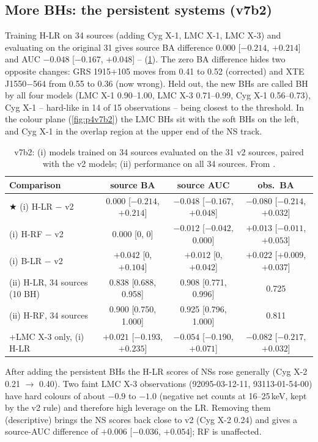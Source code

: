 \subsection{More BHs: the persistent systems (v7b2)}\label{sec:p4v7b2}
\Primary{} Training H-LR on 34 sources (adding Cyg X-1, LMC X-1, LMC X-3) and evaluating on the original 31 gives source BA
difference $0.000$ [$-0.214$, $+0.214$] and AUC $-0.048$ [$-0.167$, $+0.048$] -- \NotDetected{} (\cref{tab:p4v7b2}). The zero
BA difference hides two opposite changes: GRS 1915+105 moves from 0.41 to 0.52 (corrected) and XTE J1550$-$564 from 0.55 to 0.36
(now wrong). Held out, the new BHs are called BH by all four models (LMC X-1 0.90--1.00, LMC X-3 0.71--0.99, Cyg X-1
0.56--0.73), Cyg X-1 -- hard-like in 14 of 15 observations -- being closest to the threshold. In the colour plane
(\cref{fig:p4v7b2}) the LMC BHs sit with the soft BHs on the left, and Cyg X-1 in the overlap region at the upper end of the
NS track.

\begin{table}[htbp]
\centering\small
\caption[Adding persistent BHs]{\Primary{} v7b2: (i) models trained on 34 sources evaluated on the 31 v2 sources, paired
with the v2 models; (ii) performance on all 34 sources. From .}
\label{tab:p4v7b2}
\footnotesize\setlength{\tabcolsep}{4pt}
\begin{tabular}{@{}lccc@{}}
\toprule
Comparison & source BA & source AUC & obs.\ BA \\
\midrule
$\bigstar$ (i) H-LR $-$ v2 & $0.000$ [$-0.214$, $+0.214$] & $-0.048$ [$-0.167$, $+0.048$] & $-0.080$ [$-0.214$, $+0.032$] \\
(i) H-RF $-$ v2 & $0.000$ [0, 0] & $-0.012$ [$-0.042$, 0.000] & $+0.013$ [$-0.011$, $+0.053$] \\
(i) B-LR $-$ v2 & $+0.042$ [0, $+0.104$] & $+0.012$ [0, $+0.042$] & $+0.022$ [$+0.009$, $+0.037$] \\
(ii) H-LR, 34 sources (10 BH) & 0.838 [0.688, 0.958] & 0.908 [0.771, 0.996] & 0.725 \\
(ii) H-RF, 34 sources & 0.900 [0.750, 1.000] & 0.925 [0.796, 1.000] & 0.811 \\
+LMC X-3 only, (i) H-LR & $+0.021$ [$-0.193$, $+0.235$] & $-0.054$ [$-0.190$, $+0.071$] & $-0.082$ [$-0.217$, $+0.032$] \\
\bottomrule
\end{tabular}
\end{table}

\PostHoc{} After adding the persistent BHs the H-LR scores of NSs rose generally (Cyg X-2 0.21 $\to$ 0.40). Two faint LMC X-3
observations (92095-03-12-11, 93113-01-54-00) have hard colours of about $-0.9$ to $-1.0$ (negative net counts at 16--25\,keV,
kept by the v2 rule) and therefore high leverage on the LR. Removing them (descriptive) brings the NS scores back close to v2
(Cyg X-2 0.24) and gives a source-AUC difference of $+0.006$ [$-0.036$, $+0.054$]; RF is unaffected.

